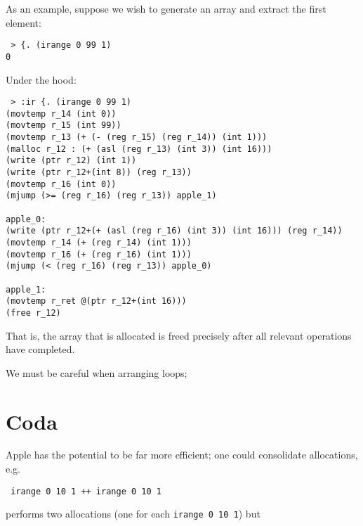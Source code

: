 \documentclass{article}
\begin{document}
As an example, suppose we wish to generate an array and extract the first element:

\begin{verbatim}
 > {. (irange 0 99 1)
0
\end{verbatim}

Under the hood:

\begin{verbatim}
 > :ir {. (irange 0 99 1)
(movtemp r_14 (int 0))
(movtemp r_15 (int 99))
(movtemp r_13 (+ (- (reg r_15) (reg r_14)) (int 1)))
(malloc r_12 : (+ (asl (reg r_13) (int 3)) (int 16)))
(write (ptr r_12) (int 1))
(write (ptr r_12+(int 8)) (reg r_13))
(movtemp r_16 (int 0))
(mjump (>= (reg r_16) (reg r_13)) apple_1)

apple_0:
(write (ptr r_12+(+ (asl (reg r_16) (int 3)) (int 16))) (reg r_14))
(movtemp r_14 (+ (reg r_14) (int 1)))
(movtemp r_16 (+ (reg r_16) (int 1)))
(mjump (< (reg r_16) (reg r_13)) apple_0)

apple_1:
(movtemp r_ret @(ptr r_12+(int 16)))
(free r_12)
\end{verbatim}

That is, the array that is allocated is freed precisely after all relevant operations have completed.

We must be careful when arranging loops;


\section{Coda}

Apple has the potential to be far more efficient; one could consolidate allocations, e.g.

\begin{verbatim}
 irange 0 10 1 ++ irange 0 10 1
\end{verbatim}

performs two allocations (one for each {\tt irange 0 10 1}) but
\end{document}
